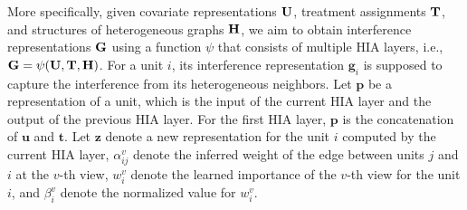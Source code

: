 \documentclass[runningheads]{llncs}
\begin{document}
More specifically, given covariate representations $\bold{U}$, treatment assignments $\bold{T}$, and structures of heterogeneous graphs $\bold{H}$, we aim to obtain interference representations $\bold{G}$ using a function $\psi$ that consists of multiple HIA layers, i.e., $\bold{G} =\psi(\bold{U},\bold{T},\bold{H})$. For a unit $i$, its  interference representation $\boldsymbol{g}_i$ is supposed to capture the interference from its heterogeneous neighbors.  Let $\boldsymbol{p}$ be a representation of a unit, which is the  input of the current HIA layer and the output of the previous HIA layer. For the first HIA layer,   
 $\boldsymbol{p}$ is the concatenation of $\boldsymbol{u}$ and $\boldsymbol{t}$.  Let $\boldsymbol{z}$ denote a new representation for the unit $i$ computed by the current HIA layer, $\alpha_{ij}^v$ denote the inferred weight of the edge between units $j$ and $i$ at the $v$-th view,  $w^v_i$ denote the learned importance of the $v$-th view for the unit $i$, and $\beta^v_i$ denote the normalized value for $w^v_i$.
\end{document}
